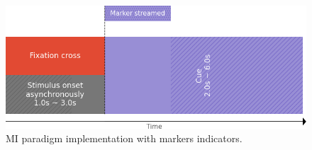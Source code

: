 \begin{figure}[H]
\begin{centering}
% 
\includegraphics[width=1\textwidth]{Appendix/databases/Figures/mi-paradigm.png}
\par\end{centering}
\caption{\gls*{MI} paradigm implementation with markers indicators.}
\label{}
\end{figure}